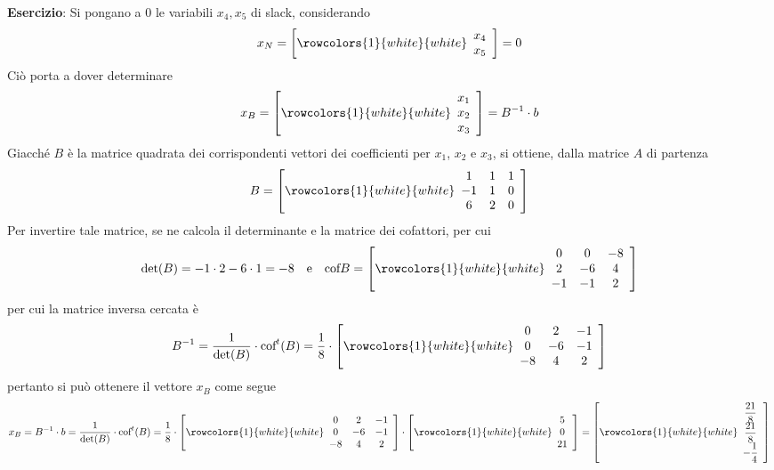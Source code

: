 \documentclass[a4paper]{extarticle}
\begin{document}
\vspace{1em}
\noindent
\textbf{Esercizio}: Si pongano a $0$ le variabili $x_4,x_5$ di slack, considerando
\[x_N = \left[
    \rowcolors{1}{white}{white}
    \begin{array}{c}
        x_4\\
        x_5
    \end{array}
\right] = 0\]
Ciò porta a dover determinare
\[x_B = \left[
    \rowcolors{1}{white}{white}
    \begin{array}{c}
        x_1\\
        x_2\\
        x_3
    \end{array}
\right] = B^{-1} \cdot b\]
Giacché $B$ è la matrice quadrata dei corrispondenti vettori dei coefficienti per $x_1$, $x_2$ e $x_3$, si ottiene, dalla matrice $A$ di partenza
\[B = \left[
    \rowcolors{1}{white}{white}
    \begin{array}{ccc}
        1 & 1 & 1\\
        -1 & 1 & 0\\
        6 & 2 & 0
    \end{array}
\right]\]
Per invertire tale matrice, se ne calcola il determinante e la matrice dei cofattori, per cui
\[\det(B) = -1 \cdot 2 - 6 \cdot 1 = -8 \hspace{1em} \text{e} \hspace{1em} \text{cof} B = \left[
    \rowcolors{1}{white}{white}
    \begin{array}{ccc}
        0 & 0 & -8\\
        2 & -6 & 4\\
        -1 & -1 & 2
    \end{array}
\right]\]
per cui la matrice inversa cercata è
\[B^{-1} = \frac{1}{\det(B)} \cdot \text{cof}^{t}(B) = \frac{1}{8} \cdot \left[
    \rowcolors{1}{white}{white}
    \begin{array}{ccc}
        0 & 2 & -1\\
        0 & -6 & -1\\
        -8 & 4 & 2
    \end{array}
\right]
\]
pertanto si può ottenere il vettore $x_B$ come segue
\[x_B=B^{-1} \cdot b = \frac{1}{\det(B)} \cdot \text{cof}^{t}(B) = \frac{1}{8} \cdot \left[
    \rowcolors{1}{white}{white}
    \begin{array}{ccc}
        0 & 2 & -1\\
        0 & -6 & -1\\
        -8 & 4 & 2
    \end{array}
\right] \cdot \left[
    \rowcolors{1}{white}{white}
    \begin{array}{c}
        5\\
        0\\
        21
    \end{array}
\right] = \left[
    \rowcolors{1}{white}{white}
    \begin{array}{c}
        \dfrac{21}{8}\\
        \dfrac{21}{8}\\
        -\dfrac{1}{4}\\
    \end{array}
\right]\]
\end{document}
